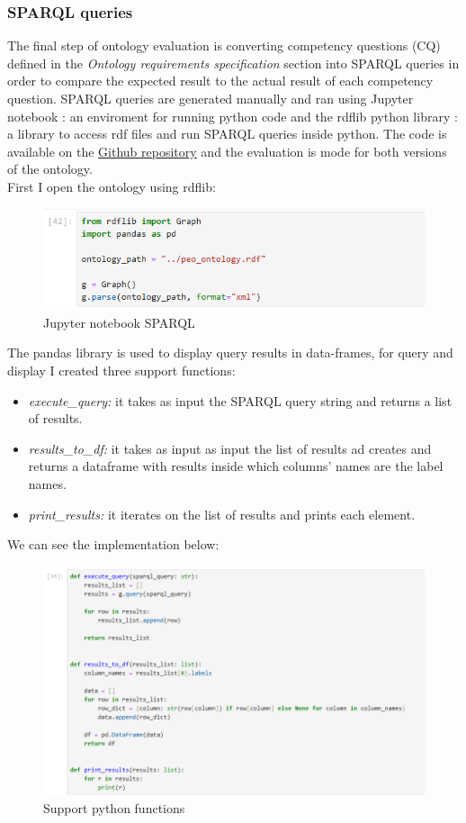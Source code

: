 \subsubsection{SPARQL queries}
The final step of ontology evaluation is converting competency questions (CQ) defined in the \textit{Ontology requirements specification} section into SPARQL queries in order to compare the expected result to the actual result of each competency question. SPARQL queries are generated manually and ran using Jupyter notebook \cite{jupyter}: an enviroment for running python code and the rdflib python library \cite{rdflib}: a library to access rdf files and run SPARQL queries inside python. The code is available on the \href{https://github.com/simonegramegna/peo/tree/main/evaluation}{Github repository} and the evaluation is mode for both versions of the ontology.\\
First I open the ontology using rdflib:
\begin{figure}[H]
    \centering
    \includegraphics[width=0.9\linewidth]{Figures/fig_45.png}
    \caption{Jupyter notebook SPARQL}
    \label{fig:enter-label}
\end{figure}
The pandas library is used to display query results in data-frames, for query and display I created three support functions: 
\begin{itemize}
    \item \textit{execute\_query:} it takes as input the SPARQL query string and returns a list of results.

    \item \textit{results\_to\_df:} it takes as input as input the list of results ad creates and returns a dataframe with results inside which columns' names are the label names.

    \item \textit{print\_results:} it iterates on the list of results and prints each element.
\end{itemize}
We can see the implementation below:
\begin{figure}[H]
    \centering
    \includegraphics[width=0.9\linewidth]{Figures/fig_46.png}
    \caption{Support python functions}
    \label{fig:enter-label}
\end{figure}
